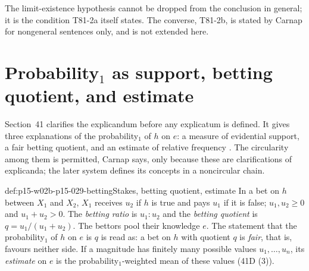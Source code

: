 The limit-existence hypothesis cannot be dropped from the conclusion in
general; it is the condition T81-2a itself states. The converse, T81-2b,
is stated by Carnap for nongeneral sentences only, and is not extended
here.

\section{Probability\texorpdfstring{\(_1\)}{1} as support, betting quotient, and estimate}
\label{sec:p15-w02b-p15-029-interpretations}

Section~41 clarifies the explicandum before any explicatum is
defined. It gives three explanations of the probability\(_1\) of
\(h\) on \(e\): a measure of evidential support, a fair betting
quotient, and an estimate of relative frequency
\cite[sec.~41, pp.~162--175]{Carnap1950Probability}. The circularity
among them is permitted, Carnap says, only because these are
clarifications of explicanda; the later system defines its concepts
in a noncircular chain.

\begin{hbdefinition}{def:p15-w02b-p15-029-betting}{Stakes, betting quotient, estimate}
In a bet on \(h\) between \(X_1\) and \(X_2\), \(X_1\) receives
\(u_2\) if \(h\) is true and pays \(u_1\) if it is false;
\(u_1,u_2\geq0\) and \(u_1+u_2>0\). The \emph{betting ratio} is
\(u_1:u_2\) and the \emph{betting quotient} is
\(q=u_1/(u_1+u_2)\). The bettors pool their knowledge \(e\). The
statement that the probability\(_1\) of \(h\) on \(e\) is \(q\)
is read as: a bet on \(h\) with quotient \(q\) is \emph{fair}, that
is, favours neither side. If a magnitude has finitely many possible
values \(u_1,\ldots,u_n\), its \emph{estimate} on \(e\) is the
probability\(_1\)-weighted mean of these values (41D (3)).
\end{hbdefinition}


